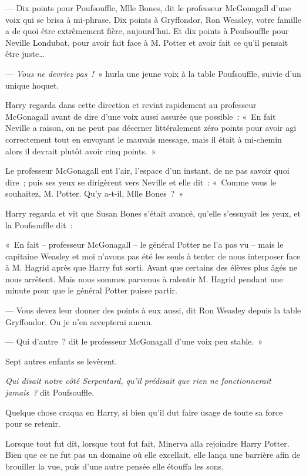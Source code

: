 --- Dix points pour Poufsouffle, Mlle Bones, dit le professeur McGonagall d'une voix qui se brisa à mi-phrase. Dix points à Gryffondor, Ron Weasley, votre famille a de quoi être extrêmement fière, aujourd'hui. Et dix points à Poufsouffle pour Neville Londubat, pour avoir fait face à M. Potter et avoir fait ce qu'il pensait être juste…

--- \emph{Vous ne devriez pas~!}~» hurla une jeune voix à la table Poufsouffle, suivie d'un unique hoquet.

Harry regarda dans cette direction et revint rapidement au professeur McGonagall avant de dire d'une voix aussi assurée que possible~: «~En fait Neville a raison, on ne peut pas décerner littéralement zéro points pour avoir agi correctement tout en envoyant le mauvais message, mais il était à mi-chemin alors il devrait plutôt avoir cinq points.~»

Le professeur McGonagall eut l'air, l'espace d'un instant, de ne pas savoir quoi dire~; puis ses yeux se dirigèrent vers Neville et elle dit~: «~Comme vous le souhaitez, M. Potter. Qu'y a-t-il, Mlle Bones~?~»

Harry regarda et vit que Susan Bones s'était avancé, qu'elle s'essuyait les yeux, et la Poufsouffle dit~:

«~En fait -- professeur McGonagall -- le général Potter ne l'a pas vu -- mais le capitaine Weasley et moi n'avons pas été les seuls à tenter de nous interposer face à M. Hagrid après que Harry fut sorti. Avant que certains des élèves plus âgés ne nous arrêtent. Mais nous sommes parvenus à ralentir M. Hagrid pendant une minute pour que le général Potter puisse partir.

--- Vous devez leur donner des points à eux aussi, dit Ron Weasley depuis la table Gryffondor. Ou je n'en accepterai aucun.

--- Qui d'autre~? dit le professeur McGonagall d'une voix peu stable.~»

Sept autres enfants se levèrent.

\emph{Qui disait notre côté Serpentard, qu'il prédisait que rien ne fonctionnerait jamais~?} dit Poufsouffle.

Quelque chose craqua en Harry, si bien qu'il dut faire usage de toute sa force pour se retenir.

\later

Lorsque tout fut dit, lorsque tout fut fait, Minerva alla rejoindre Harry Potter. Bien que ce ne fut pas un domaine où elle excellait, elle lança une barrière afin de brouiller la vue, puis d'une autre pensée elle étouffa les sons.


